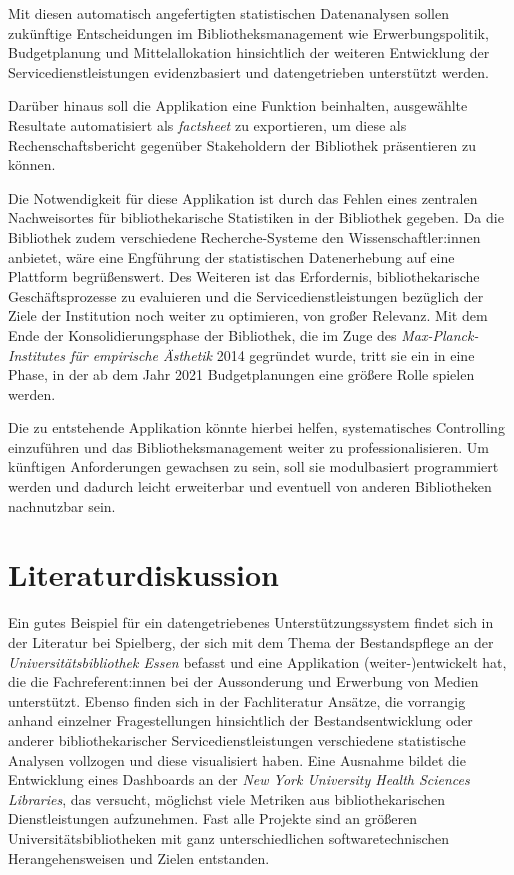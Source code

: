 \documentclass[10pt,a4paper,twocolumn,report]{IEEEtran}
\begin{document}
Mit diesen automatisch angefertigten statistischen Datenanalysen sollen zukünftige
Entscheidungen im Bibliotheksmanagement wie Erwerbungspolitik, Budgetplanung und
Mittelallokation hinsichtlich der weiteren Entwicklung der
Servicedienstleistungen evidenzbasiert und datengetrieben unterstützt werden.

Darüber hinaus soll die Applikation  eine Funktion beinhalten, ausgewählte
Resultate automatisiert als \textit{factsheet} zu exportieren, um diese
als Rechenschaftsbericht gegenüber Stakeholdern der Bibliothek präsentieren zu können.

Die Notwendigkeit für diese Applikation ist durch das
Fehlen eines zentralen Nachweisortes für bibliothekarische
Statistiken in der Bibliothek gegeben. Da die Bibliothek zudem verschiedene Recherche-Systeme den
Wissenschaftler:innen anbietet, wäre eine Engführung der statistischen
Datenerhebung auf eine Plattform begrüßenswert.
Des Weiteren ist das Erfordernis, bibliothekarische Geschäftsprozesse zu evaluieren und die
Servicedienstleistungen bezüglich der Ziele der Institution noch weiter zu
optimieren, von großer Relevanz. Mit dem Ende der Konsolidierungsphase der
Bibliothek, die im Zuge des \textit{Max-Planck-Institutes für empirische
Ästhetik} 2014 gegründet wurde, tritt sie ein in eine Phase, in der ab dem Jahr
2021 Budgetplanungen eine größere Rolle spielen werden.

Die zu entstehende Applikation könnte hierbei helfen, systematisches Controlling einzuführen und das
Bibliotheksmanagement weiter zu professionalisieren.
Um künftigen Anforderungen gewachsen zu sein, soll sie
modulbasiert programmiert werden und dadurch leicht erweiterbar und eventuell von
anderen Bibliotheken nachnutzbar sein.


\section{Literaturdiskussion}
Ein gutes Beispiel für ein datengetriebenes Unterstützungssystem findet sich in
der Literatur bei Spielberg, der sich mit dem Thema der Bestandspflege an der
\textit{Universitätsbibliothek Essen} befasst und eine Applikation (weiter-)entwickelt hat, die
die Fachreferent:innen bei der Aussonderung und Erwerbung von Medien
unterstützt.\cite{RN48}
Ebenso finden sich in der Fachliteratur Ansätze, die vorrangig anhand einzelner
Fragestellungen hinsichtlich der Bestandsentwicklung\cite{RN28} oder anderer
bibliothekarischer Servicedienstleistungen\cite{RN43,RN41,RN45} verschiedene statistische Analysen
vollzogen und diese visualisiert haben.
Eine Ausnahme bildet die Entwicklung eines Dashboards an der \textit{New York
University Health Sciences Libraries}, das versucht, möglichst viele Metriken
aus bibliothekarischen Dienstleistungen aufzunehmen.\cite{RN34}
Fast alle Projekte sind an größeren
Universitätsbibliotheken mit ganz unterschiedlichen softwaretechnischen
Herangehensweisen\cite{RN31,RN42} und Zielen\cite{RN1} entstanden.
\end{document}
